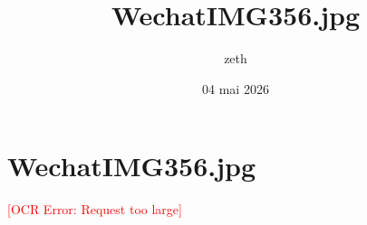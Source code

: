 \documentclass[12pt,a4paper]{article}
\title{WechatIMG356.jpg}
\author{zeth}
\date{04 mai 2026}
\begin{document}
\maketitle

\section*{WechatIMG356.jpg}
\textcolor{red}{[OCR Error: Request too large]}
\end{document}
